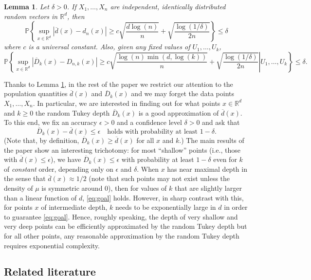 \documentclass[12pt]{article}
\newcommand{\R}{\mathbb{R}}
\newcommand{\ol}{\overline}
\newcommand{\field}[1]{\mathbb{#1}}
\newcommand{\PROB}{\field{P}}
\newtheorem{lemma}[theorem]{Lemma}
\begin{document}
\begin{lemma}
\label{TheEmpGap}
Let $\delta>0$. 
If $X_1,\ldots,X_n$ are independent, identically distributed random
vectors in $\R^d$, then
\[
\PROB\left\{   \sup_{x\in \R^d} |\ol{d}(x) - d_n(x)|\ge c\sqrt{\frac{d\log(n)}{n}} + \sqrt{\frac{\log(1/\delta)}{2n}} \right\} \le \delta
\]
where $c$ is a universal constant.
Also, given any fixed values of $U_1,\ldots,U_k$, 
\[
\PROB\left\{   \left. \sup_{x\in \R^d} |\ol{D}_k(x) - D_{n,k}(x)| \geq c\sqrt{\frac{\log(n)\min(d,\log(k))}{n}} + \sqrt{\frac{\log(1/\delta)}{2n}} \right| U_1,\ldots,U_k \right\} \leq \delta.
\]
\end{lemma}

Thanks to Lemma \ref{TheEmpGap}, in the rest of the paper we restrict our attention to
the population quantities $\ol{d}(x)$ and $\ol{D}_k(x)$ and we may forget the data points $X_1,\ldots,X_n$.
In particular, we are interested in finding out for what points $x\in \R^d$ and $k\ge 0$ the random Tukey depth $\ol{D}_k(x)$ is a good
approximation of $\ol{d}(x)$. To this end, we fix an accuracy $\epsilon >0$ and a confidence
level $\delta>0$ and ask that
\begin{equation}
\label{eq:goal}
\ol{D}_k(x) - \ol{d}(x)\le \epsilon \quad
\text{holds with probability at least $1-\delta$}.
 \end{equation}
(Note that, by definition, $\ol{D}_k(x) \ge \ol{d}(x)$ for all $x$ and $k$.)
The main results of the paper show an interesting trichotomy: for most ``shallow'' points (i.e., those
with $\ol{d}(x) \le \epsilon$),  we have $\ol{D}_k(x)\le \epsilon$ with probability at least $1-\delta$
even for $k$ of \emph{constant} order, depending only on $\epsilon$ and $\delta$.
When $x$ has near maximal depth in the sense that $\ol{d}(x) \approx 1/2$ (note that such points may
not exist unless the density of $\mu$ is symmetric around $0$), then for values of $k$ that are slightly
larger than a linear function of $d$, \eqref{eq:goal} holds. However, in sharp contrast with this,
for points $x$ of intermediate depth, $k$ needs to be exponentially large in $d$ in order to guarantee
\eqref{eq:goal}. Hence, roughly speaking, the depth of very shallow and very deep points can be
efficiently approximated by the random Tukey depth but for all other points, any reasonable
approximation by the random Tukey depth requires exponential complexity.





\subsection{Related literature}
\end{document}
